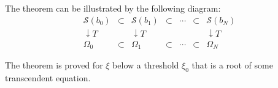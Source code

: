 \documentclass[a5paper]{article}
\begin{document}
The theorem can be illustrated by the following diagram:
\begin{equation}
\begin{array}{lllllll}
	\mathcal{S}(b_0) & \subset & \mathcal{S}(b_1) & \subset & \cdots & \subset & \mathcal{S}(b_N) \\ [2mm]
	\downarrow{T} & & \downarrow{T} & & & & \downarrow{T} \\ [2mm]
	\Omega_0 & \subset & \Omega_1 & \subset & \cdots & \subset & \Omega_N
\end{array}
\end{equation}

The theorem is proved for $\xi$ below a threshold $\xi_0$ that is a root of some transcendent equation.
\end{document}
